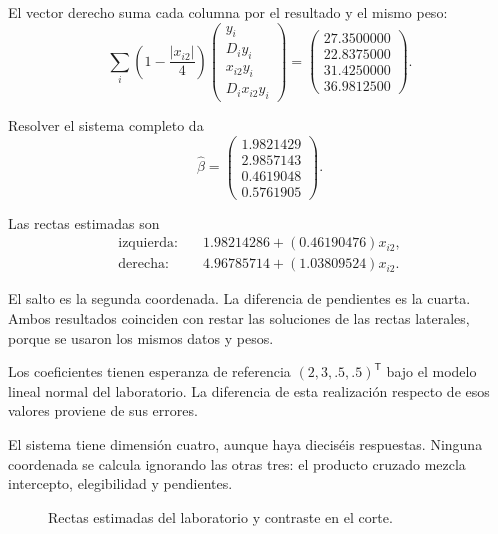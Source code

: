 \documentclass[11pt,a4paper]{article}
\newcommand{\T}{^{\mathsf T}}
\begin{document}
El vector derecho suma cada columna por
el resultado y el mismo peso:
\[
\sum_i\left(1-\frac{|x_{i2}|}{4}\right)
\begin{pmatrix}y_i\\D_iy_i\\x_{i2}y_i\\D_ix_{i2}y_i\end{pmatrix}
=\begin{pmatrix}27.3500000\\22.8375000\\31.4250000\\36.9812500\end{pmatrix}.
\]

Resolver el sistema completo da
\[
\widehat\beta=\begin{pmatrix}1.9821429\\2.9857143\\0.4619048\\0.5761905\end{pmatrix}.
\]

Las rectas estimadas son
\[
\begin{aligned}
\text{izquierda}:\quad&1.98214286+(0.46190476)x_{i2},\\\text{derecha}:\quad&4.96785714+(1.03809524)x_{i2}.\end{aligned}
\]

El salto es la segunda coordenada.
La diferencia de pendientes es la cuarta.
Ambos resultados coinciden con restar
las soluciones de las rectas laterales,
porque se usaron los mismos datos y pesos.

Los coeficientes tienen esperanza de referencia
\((2,3,.5,.5)\T\) bajo el modelo lineal
normal del laboratorio.
La diferencia de esta realización respecto
de esos valores proviene de sus errores.

El sistema tiene dimensión cuatro,
aunque haya dieciséis respuestas.
Ninguna coordenada se calcula ignorando
las otras tres: el producto cruzado
mezcla intercepto, elegibilidad y pendientes.

\begin{figure}[H]\centering
{}
\caption{Rectas estimadas del laboratorio y contraste en el corte.}
\end{figure}
\end{document}
